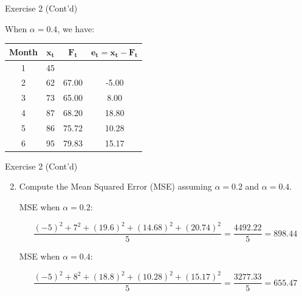\documentclass[
  ignorenonframetext,
  aspectratio=43,
]{beamer}
\let\olditem\item
\renewcommand\item{\olditem\justifying}
\begin{document}
\begin{frame}{Exercise 2 (Cont'd)}
\protect\hypertarget{exercise-2-contd-1}{}
\pause

When \(\alpha = 0.4\), we have: \vspace{0.25cm}

\pause

\begin{table}[h!]
\centering
\begin{tabular}{c c c c}
\toprule
Month & $\mathbf{x_t}$ & $\mathbf{F_t}$ & $\mathbf{e_t = x_t - F_t}$ \\
\midrule
1 & 45 &        &        \\
2 & 62 & 67.00  & -5.00  \\
3 & 73 & 65.00  & 8.00   \\
4 & 87 & 68.20  & 18.80  \\
5 & 86 & 75.72  & 10.28  \\
6 & 95 & 79.83  & 15.17  \\
\bottomrule
\end{tabular}
\end{table}
\end{frame}

\begin{frame}{Exercise 2 (Cont'd)}
\protect\hypertarget{exercise-2-contd-2}{}
\begin{enumerate}
\setcounter{enumi}{1}
\item
  Compute the Mean Squared Error (MSE) assuming \(\alpha = 0.2\) and
  \(\alpha = 0.4\).

  \pause

  MSE when \(\alpha = 0.2\): \vspace{-0.5cm}

  \pause

  \[
   \frac{(-5)^2 + 7^2 + (19.6)^2 + (14.68)^2 + (20.74)^2}{5} = \frac{4492.22}{5} = 898.44
   \]

  \pause

  MSE when \(\alpha = 0.4\): \vspace{-0.5cm}

  \pause

  \[
   \frac{(-5)^2 + 8^2 + (18.8)^2 + (10.28)^2 + (15.17)^2}{5} = \frac{3277.33}{5} = 655.47
   \]
\end{enumerate}
\end{frame}
\end{document}
